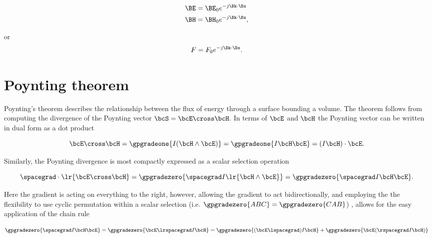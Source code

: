 \begin{dmath}\label{eqn:maxwellsEquations:580}
\begin{aligned}
\BE &= \BE_0 e^{-j \Bk \cdot \Bx} \\
\BH &= \BH_0 e^{-j \Bk \cdot \Bx},
\end{aligned}
\end{dmath}

or
\begin{dmath}\label{eqn:maxwellsEquations:600}
F = F_0 e^{-j \Bk \cdot \Bx}.
\end{dmath}



\section{Poynting theorem}

Poynting's theorem describes the relationship between the flux of energy through a surface bounding a volume.
The theorem follows from computing the divergence of the Poynting vector \( \bcS = \bcE \cross \bcH \).  In terms of \( \bcE \) and \( \bcH \) the Poynting vector can be written in dual form as a dot product

\begin{equation}\label{eqn:maxwellsEquations:780}
\bcE \cross \bcH
=
\gpgradeone{ I (\bcH \wedge \bcE) }
=
\gpgradeone{ I \bcH \bcE }
=
(I \bcH) \cdot \bcE.
\end{equation}

Similarly, the Poynting divergence is most compactly expressed as a scalar selection operation

\begin{equation}\label{eqn:maxwellsEquations:640}
\spacegrad \cdot \lr{ \bcE \cross \bcH }
=
\gpgradezero{ \spacegrad I \lr{ \bcH \wedge \bcE } }
=
\gpgradezero{ \spacegrad I \bcH \bcE }.
\end{equation}

Here the gradient is acting on everything to the right, however, allowing the gradient to act bidirectionally, and employing the
the flexibility to use cyclic permutation within a scalar selection
(i.e. \(\gpgradezero{ABC} = \gpgradezero{CAB}\))
, allows for the easy application of the chain rule

\begin{dmath}\label{eqn:maxwellsEquations:760}
\gpgradezero{ \spacegrad I \bcH \bcE }
=
\gpgradezero{ \bcE \lrspacegrad I \bcH }
=
\gpgradezero{ (\bcE \lspacegrad) I \bcH }
+\gpgradezero{ \bcE (\rspacegrad I \bcH) }
\end{dmath}

